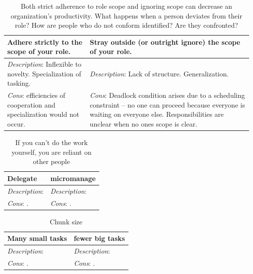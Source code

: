 \begin{center}
\begin{table}[ht]
\begin{tabular}{ | m{\dilemmatablewidth}| m{\dilemmatablewidth} | } 
  \hline
  \textbf{Adhere strictly to the scope of your role.} & 
  \textbf{Stray outside (or outright ignore) the scope of your role.} \\ 
  \hline
  \textit{Description}: Inflexible to novelty. Specialization of tasking. & 
  \textit{Description}: Lack of structure. Generalization. \\ 
  \hline
  \textit{Cons}: efficiencies of cooperation and specialization would not occur. & 
  \textit{Cons}: Deadlock condition arises due to a scheduling constraint -- no one can proceed because everyone is waiting on everyone else. Responsibilities are unclear when no ones scope is clear. \\  
  \hline
\end{tabular}
\caption{Both strict adherence to role scope and ignoring scope can decrease an organization's productivity. 
What happens when a person deviates from their role?
How are people who do not conform identified? Are they confronted?
}
\label{table:scope_of_activity}
\end{table}
\end{center}

\begin{center}
\begin{table}[ht]
\begin{tabular}{ | m{\dilemmatablewidth}| m{\dilemmatablewidth} | } 
  \hline
  \textbf{Delegate} & 
  \textbf{micromanage} \\ 
  \hline
  \textit{Description}:  & 
  \textit{Description}:  \\ 
  \hline
  \textit{Cons}: . & 
  \textit{Cons}: . \\  
  \hline
\end{tabular}
\caption{If you can't do the work yourself, you are reliant on other people
}
\label{table:oversight_delegate_or_micromanage}
\end{table}
\end{center}

\begin{center}
\begin{table}[ht]
\begin{tabular}{ | m{\dilemmatablewidth}| m{\dilemmatablewidth} | } 
  \hline
  \textbf{Many small tasks} & 
  \textbf{fewer big tasks} \\ 
  \hline
  \textit{Description}:  & 
  \textit{Description}:  \\ 
  \hline
  \textit{Cons}: . & 
  \textit{Cons}: . \\  
  \hline
\end{tabular}
\caption{Chunk size
}
\label{table:chunk_size}
\end{table}
\end{center}

